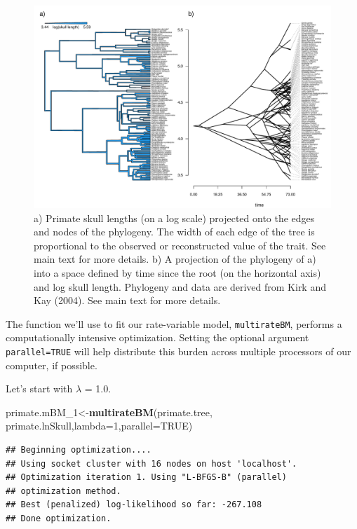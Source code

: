 \documentclass[fleqn,10pt,lineno]{wlpeerj} %
\newenvironment{Shaded}{\begin{snugshade}}{\end{snugshade}}
\newcommand{\AttributeTok}[1]{\textcolor[rgb]{0.13,0.29,0.53}{#1}}
\newcommand{\ConstantTok}[1]{\textcolor[rgb]{0.56,0.35,0.01}{#1}}
\newcommand{\DecValTok}[1]{\textcolor[rgb]{0.00,0.00,0.81}{#1}}
\newcommand{\FunctionTok}[1]{\textcolor[rgb]{0.13,0.29,0.53}{\textbf{#1}}}
\newcommand{\NormalTok}[1]{#1}
\newcommand{\OtherTok}[1]{\textcolor[rgb]{0.56,0.35,0.01}{#1}}
\begin{document}
\begin{figure}
\includegraphics[width=1\linewidth]{Revell.phytools-v2_peerj_files/figure-latex/primate-edgewidth-1} \caption{a) Primate skull lengths (on a log scale) projected onto the edges and nodes of the phylogeny. The width of each edge of the tree is proportional to the observed or reconstructed value of the trait. See main text for more details. b) A projection of the phylogeny of a) into a space defined by time since the root (on the horizontal axis) and log skull length. Phylogeny and data are derived from Kirk and Kay (2004). See main text for more details.}\label{fig:primate-edgewidth}
\end{figure}

The function we'll use to fit our rate-variable model, \texttt{multirateBM}, performs a computationally intensive optimization. Setting the optional argument \texttt{parallel=TRUE} will help distribute this burden across multiple processors of our computer, if possible.

Let's start with \(\lambda\) = 1.0.

\begin{Shaded}
\begin{Highlighting}[]
\NormalTok{primate.mBM\_1}\OtherTok{\textless{}{-}}\FunctionTok{multirateBM}\NormalTok{(primate.tree,}
\NormalTok{  primate.lnSkull,}\AttributeTok{lambda=}\DecValTok{1}\NormalTok{,}\AttributeTok{parallel=}\ConstantTok{TRUE}\NormalTok{)}
\end{Highlighting}
\end{Shaded}

\begin{verbatim}
## Beginning optimization....
## Using socket cluster with 16 nodes on host 'localhost'.
## Optimization iteration 1. Using "L-BFGS-B" (parallel) 
## optimization method.
## Best (penalized) log-likelihood so far: -267.108 
## Done optimization.
\end{verbatim}
\end{document}
